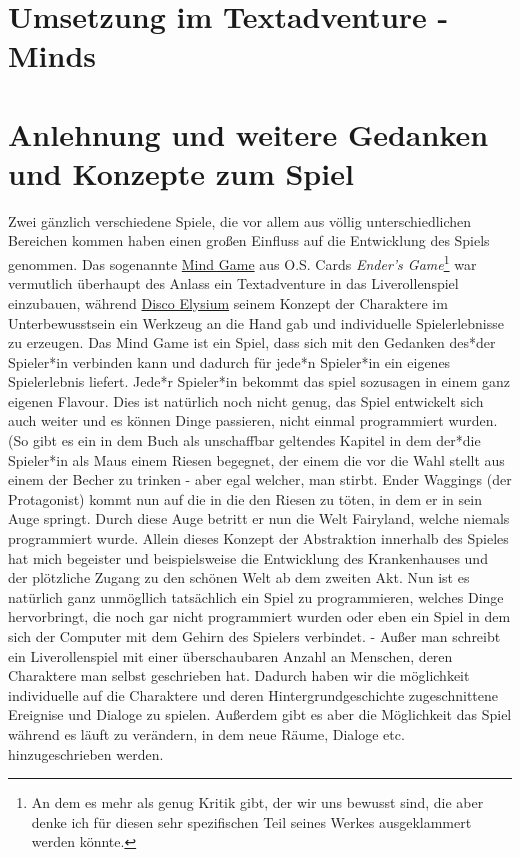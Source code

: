 \documentclass[12pt, a4paper, openany]{report}
\begin{document}
\section{Umsetzung im Textadventure - Minds}

\section{Anlehnung und weitere Gedanken und Konzepte zum Spiel}\label{txtad-anlehnung}
Zwei gänzlich verschiedene Spiele, die vor allem aus völlig unterschiedlichen Bereichen kommen haben einen großen Einfluss auf die Entwicklung des Spiels genommen.
 Das sogenannte \glqq \href{https://enderverse.fandom.com/wiki/Mind_Game}{Mind Game}\grqq{} aus O.S. Cards \textit{Ender's Game}\footnote{An dem es mehr als genug Kritik gibt, der wir uns bewusst sind, die aber denke ich für diesen sehr spezifischen Teil seines Werkes ausgeklammert werden könnte.} war vermutlich überhaupt des Anlass ein Textadventure in das Liverollenspiel einzubauen, während \glqq \href{https://www.pcgames.de/Disco-Elysium-Spiel-72334/Tests/Review-Wertung-zaum-adventure-Rollenspiel-rpg-1336586/}{Disco Elysium}\grqq{} seinem Konzept der Charaktere im Unterbewusstsein ein Werkzeug an die Hand gab und individuelle Spielerlebnisse zu erzeugen.
Das Mind Game ist ein Spiel, dass sich mit den Gedanken des*der Spieler*in verbinden kann und dadurch für jede*n Spieler*in ein eigenes Spielerlebnis liefert. 
Jede*r Spieler*in bekommt das spiel sozusagen in einem ganz eigenen Flavour. 
Dies ist natürlich noch nicht genug, das Spiel entwickelt sich auch weiter und es können Dinge passieren, nicht einmal programmiert wurden.
(So gibt es ein in dem Buch als unschaffbar geltendes Kapitel in dem der*die Spieler*in als Maus einem Riesen begegnet, der einem die vor die Wahl stellt aus einem der Becher zu trinken - aber egal welcher, man stirbt. 
Ender Waggings (der Protagonist) kommt nun auf die in die den Riesen zu töten, in dem er in sein Auge springt.
Durch diese Auge betritt er nun die Welt \glqq Fairyland\grqq{}, welche niemals programmiert wurde.
Allein dieses Konzept der Abstraktion innerhalb des Spieles hat mich begeister und beispielsweise die Entwicklung des Krankenhauses und der plötzliche Zugang zu den schönen Welt ab dem zweiten Akt. 
Nun ist es natürlich ganz unmögllich tatsächlich ein Spiel zu programmieren, welches Dinge hervorbringt, die noch gar nicht programmiert wurden oder eben ein Spiel in dem sich \glqq der Computer mit dem Gehirn des Spielers verbindet\grqq .
- Außer man schreibt ein Liverollenspiel mit einer überschaubaren Anzahl an Menschen, deren Charaktere man selbst geschrieben hat. 
Dadurch haben wir die möglichkeit individuelle auf die Charaktere und deren Hintergrundgeschichte zugeschnittene Ereignise und Dialoge zu spielen. 
Außerdem gibt es aber die Möglichkeit das Spiel während es läuft zu verändern, in dem neue Räume, Dialoge etc. hinzugeschrieben werden. 
\end{document}
